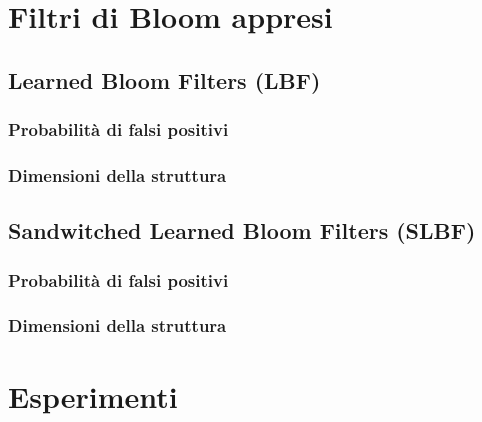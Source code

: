 \documentclass[4apaper,11pt]{report}
\begin{document}
\chapter{Filtri di Bloom appresi}
\label{chap:filtriAppresi}

\section{Learned Bloom Filters (LBF)}

\subsection{Probabilità di falsi positivi}
\label{sec:falseProbLBF}

\subsection{Dimensioni della struttura}

\section{Sandwitched Learned Bloom Filters (SLBF)}

\subsection{Probabilità di falsi positivi}

\subsection{Dimensioni della struttura}


\chapter{Esperimenti}
\label{chap:Esperimenti}

\label{sec:Esperimenti}


\end{document}
